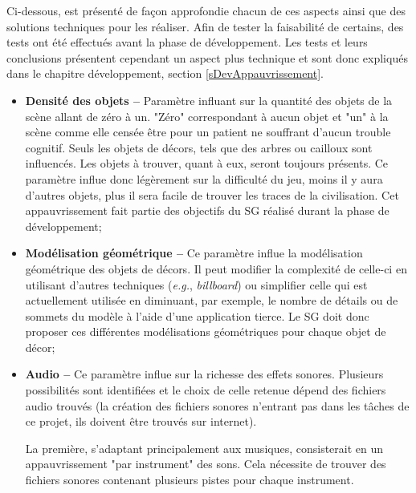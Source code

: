 		Ci-dessous, est présenté de façon approfondie chacun de ces aspects ainsi que des solutions techniques pour les réaliser. Afin de tester la faisabilité de certains, des tests ont été effectués avant la phase de développement. Les tests et leurs conclusions présentent cependant un aspect plus technique et sont donc expliqués dans le chapitre développement, section \ref{sDevAppauvrissement}.
		\begin{itemize}
			\item \textbf{Densité des objets --} Paramètre influant sur la quantité des objets de la scène allant de zéro à un. "Zéro" correspondant à aucun objet et "un" à la scène comme elle censée être pour un patient ne souffrant d'aucun trouble cognitif. Seuls les objets de décors, tels que des arbres ou cailloux sont influencés. Les objets à trouver, quant à eux, seront toujours présents. Ce paramètre influe donc légèrement sur la difficulté du jeu, moins il y aura d'autres objets, plus il sera facile de trouver les traces de la civilisation. Cet appauvrissement fait partie des objectifs du SG réalisé durant la phase de développement;
			
			\item \textbf{Modélisation géométrique --} Ce paramètre influe la modélisation géométrique des objets de décors. Il peut modifier la complexité de celle-ci en utilisant d'autres techniques (\textit{e.g.}, \textit{billboard}) ou simplifier celle qui est actuellement utilisée en diminuant, par exemple, le nombre de détails ou de sommets du modèle à l'aide d'une application tierce. Le SG doit donc proposer ces différentes modélisations géométriques pour chaque objet de décor;
			
			\item \textbf{Audio --} Ce paramètre influe sur la richesse des effets sonores. Plusieurs possibilités sont identifiées et le choix de celle retenue dépend des fichiers audio trouvés (la création des fichiers sonores n'entrant pas dans les tâches de ce projet, ils doivent être trouvés sur internet).
			
			La première, s'adaptant principalement aux musiques, consisterait en un appauvrissement "par instrument" des sons. Cela nécessite de trouver des fichiers sonores contenant plusieurs pistes pour chaque instrument.
			

\end{itemize}
